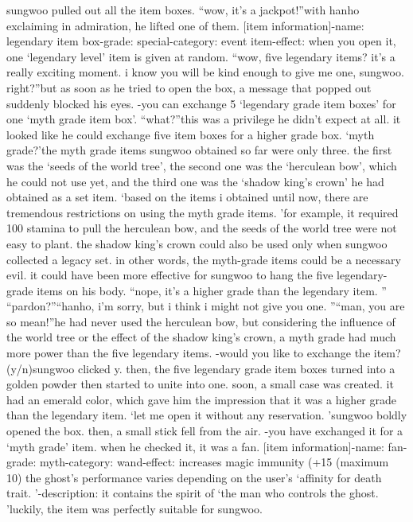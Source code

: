 sungwoo pulled out all the item boxes.
“wow, it’s a jackpot!”with hanho exclaiming in admiration, he lifted one of them.
[item information]-name: legendary item box-grade: special-category: event item-effect: when you open it, one ‘legendary level’ item is given at random.
“wow, five legendary items? it’s a really exciting moment.
 i know you will be kind enough to give me one, sungwoo.
 right?”but as soon as he tried to open the box, a message that popped out suddenly blocked his eyes.
-you can exchange 5 ‘legendary grade item boxes’ for one ‘myth grade item box’.
“what?”this was a privilege he didn’t expect at all.
 it looked like he could exchange five item boxes for a higher grade box.
‘myth grade?’the myth grade items sungwoo obtained so far were only three.
the first was the ‘seeds of the world tree’, the second one was the ‘herculean bow’, which he could not use yet, and the third one was the ‘shadow king’s crown’ he had obtained as a set item.
‘based on the items i obtained until now, there are tremendous restrictions on using the myth grade items.
’for example, it required 100 stamina to pull the herculean bow, and the seeds of the world tree were not easy to plant.
 the shadow king’s crown could also be used only when sungwoo collected a legacy set.
in other words, the myth-grade items could be a necessary evil.
 it could have been more effective for sungwoo to hang the five legendary-grade items on his body.
“nope, it’s a higher grade than the legendary item.
”
“pardon?”“hanho, i’m sorry, but i think i might not give you one.
”“man, you are so mean!”he had never used the herculean bow, but considering the influence of the world tree or the effect of the shadow king’s crown, a myth grade had much more power than the five legendary items.
-would you like to exchange the item? (y/n)sungwoo clicked y.
 then, the five legendary grade item boxes turned into a golden powder then started to unite into one.
 soon, a small case was created.
 it had an emerald color, which gave him the impression that it was a higher grade than the legendary item.
‘let me open it without any reservation.
’sungwoo boldly opened the box.
 then, a small stick fell from the air.
-you have exchanged it for a ‘myth grade’ item.
when he checked it, it was a fan.
[item information]-name: fan-grade: myth-category: wand-effect: increases magic immunity (+15%
 (maximum 10) the ghost’s performance varies depending on the user’s ‘affinity for death trait.
’-description: it contains the spirit of ‘the man who controls the ghost.
’luckily, the item was perfectly suitable for sungwoo.
